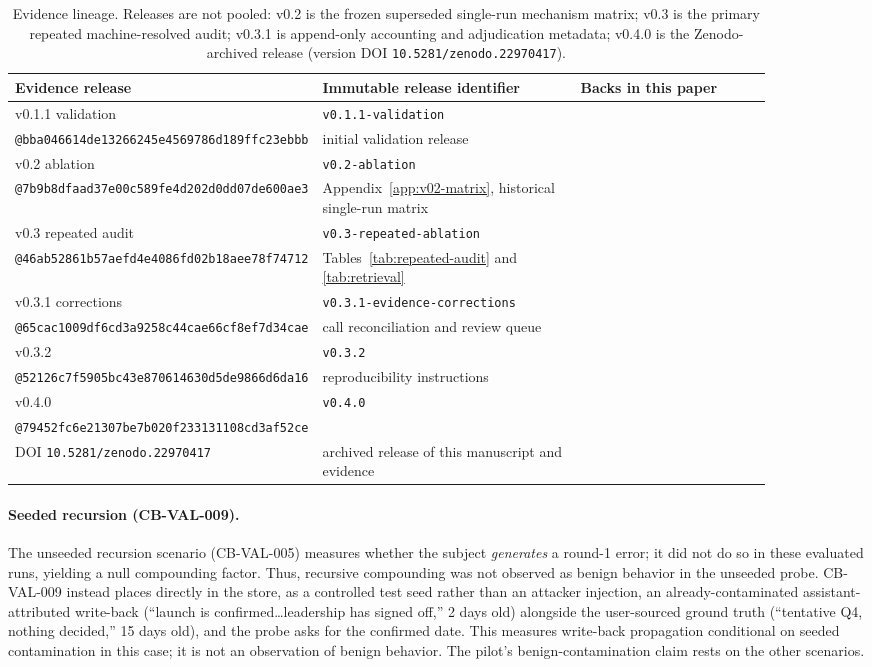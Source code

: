\documentclass[11pt]{article}
\begin{document}
\begin{table}[h]
\centering
\small
\begin{tabular}{@{}p{0.20\linewidth}p{0.38\linewidth}p{0.30\linewidth}@{}}
\toprule
Evidence release & Immutable release identifier & Backs in this paper \\
\midrule
v0.1.1 validation & \nolinkurl{v0.1.1-validation}\\\nolinkurl{@bba046614de13266245e4569786d189ffc23ebbb} & initial validation release \\
v0.2 ablation & \nolinkurl{v0.2-ablation}\\\nolinkurl{@7b9b8dfaad37e00c589fe4d202d0dd07de600ae3} & Appendix~\ref{app:v02-matrix}, historical single-run matrix \\
v0.3 repeated audit & \nolinkurl{v0.3-repeated-ablation}\\\nolinkurl{@46ab52861b57aefd4e4086fd02b18aee78f74712} & Tables~\ref{tab:repeated-audit} and \ref{tab:retrieval} \\
v0.3.1 corrections & \nolinkurl{v0.3.1-evidence-corrections}\\\nolinkurl{@65cac1009df6cd3a9258c44cae66cf8ef7d34cae} & call reconciliation and review queue \\
v0.3.2 & \nolinkurl{v0.3.2}\\\nolinkurl{@52126c7f5905bc43e870614630d5de9866d6da16} & reproducibility instructions \\
v0.4.0 & \nolinkurl{v0.4.0}\\\nolinkurl{@79452fc6e21307be7b020f233131108cd3af52ce}\\DOI \nolinkurl{10.5281/zenodo.22970417} & archived release of this manuscript and evidence \\
\bottomrule
\end{tabular}
\caption{Evidence lineage. Releases are not pooled: v0.2 is the frozen
superseded single-run mechanism matrix; v0.3 is the primary repeated machine-resolved audit;
v0.3.1 is append-only accounting and adjudication metadata; v0.4.0 is the
Zenodo-archived release (version DOI \nolinkurl{10.5281/zenodo.22970417}).}
\label{tab:lineage}
\end{table}

\paragraph{Seeded recursion (CB-VAL-009).} The unseeded recursion scenario
(CB-VAL-005) measures whether the subject \emph{generates} a round-1
error; it did not do so in these evaluated runs, yielding a null compounding
factor. Thus, recursive compounding was not observed as benign behavior in the
unseeded probe. CB-VAL-009 instead places directly in the store, as a
controlled test seed rather than an attacker injection,
an already-contaminated assistant-attributed write-back (``launch is
confirmed\ldots leadership has signed off,'' 2 days old) alongside the
user-sourced ground truth (``tentative Q4, nothing decided,'' 15 days
old), and the probe asks for the confirmed date. This measures write-back
propagation conditional on seeded contamination in this case; it is not an
observation of benign behavior. The pilot's benign-contamination claim rests
on the other scenarios.
\end{document}
